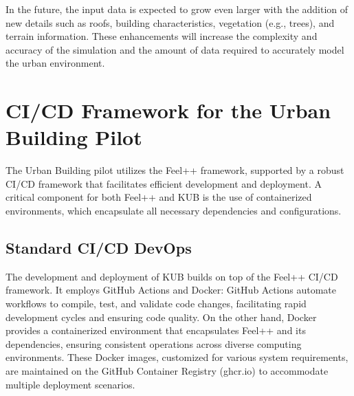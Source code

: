 \documentclass[runningheads]{llncs}
\begin{document}
In the future, the input data is expected to grow even larger with the addition of new details such as roofs, building characteristics, vegetation (e.g., trees), and terrain information.
These enhancements will increase the complexity and accuracy of the simulation and the amount of data required to accurately model the urban environment.

\section{CI/CD Framework for the Urban Building Pilot}
\label{sec:cicd-framework}

The Urban Building pilot utilizes the Feel++ framework, supported by a robust CI/CD framework that facilitates efficient development and deployment.
A critical component for both Feel++ and KUB is the use of containerized environments, which encapsulate all necessary dependencies and configurations.



\subsection{Standard CI/CD DevOps}
The development and deployment of KUB builds on top of the Feel++ CI/CD framework. It employs GitHub Actions and Docker: GitHub Actions automate workflows to compile, test, and validate code changes, facilitating rapid development cycles and ensuring code quality.
On the other hand, Docker provides a containerized environment that encapsulates Feel++ and its dependencies, ensuring consistent operations across diverse computing environments.
These Docker images, customized for various system requirements, are maintained on the GitHub Container Registry (ghcr.io) to accommodate multiple deployment scenarios.
\end{document}
